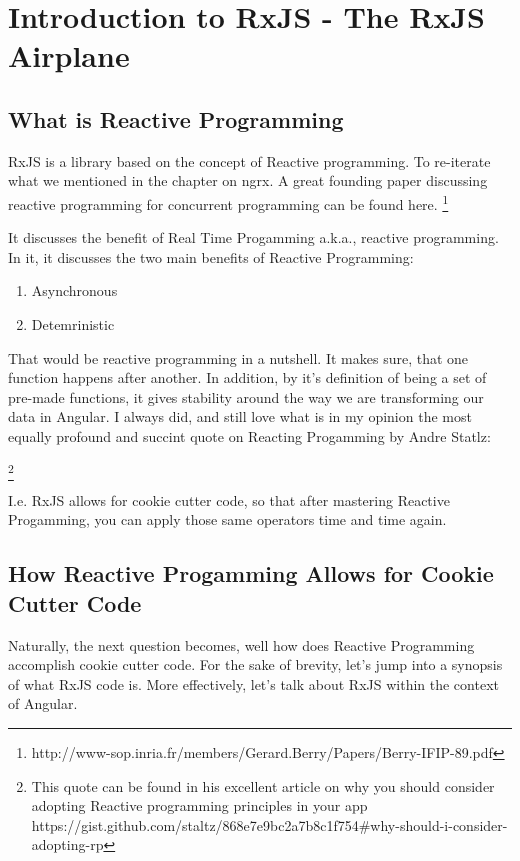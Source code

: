 \chapter{ Introduction to RxJS - The RxJS Airplane}

\section{ What is Reactive Programming}

RxJS is a library based on the concept of Reactive programming. To re-iterate 
what we mentioned in the chapter on ngrx. A great founding paper discussing 
reactive programming for concurrent programming can be found here. 
\footnote{http://www-sop.inria.fr/members/Gerard.Berry/Papers/Berry-IFIP-89.pdf}

It discusses the benefit of Real Time Progamming a.k.a., reactive programming.
In it, it discusses the two main benefits of Reactive Programming:
\begin{enumerate}
  \item Asynchronous
  \item Detemrinistic
\end{enumerate}

That would be reactive programming in a nutshell. It makes sure, that one 
function happens after another. In addition, by it's definition of being 
a set of pre-made functions, it gives stability around the way we are 
transforming our data in Angular. I always did, and still love what is in my 
opinion the most equally profound and succint quote on Reacting Progamming by 
Andre Statlz: 

\begin{quote}
\end{quote} 
\footnote{This quote can be found in his excellent article on why you should 
consider adopting Reactive programming principles in your app 
https://gist.github.com/staltz/868e7e9bc2a7b8c1f754\#why-should-i-consider-adopting-rp}

I.e. RxJS allows for cookie cutter code, so that after mastering Reactive 
Progamming, you can apply those same operators time and time again.

\section{How Reactive Progamming Allows for Cookie Cutter Code}
Naturally, the next question becomes, well how does Reactive Programming accomplish cookie 
cutter code. For the sake of brevity, let's jump into a synopsis of what RxJS 
code is. More effectively, let's talk about RxJS within the context of Angular.

